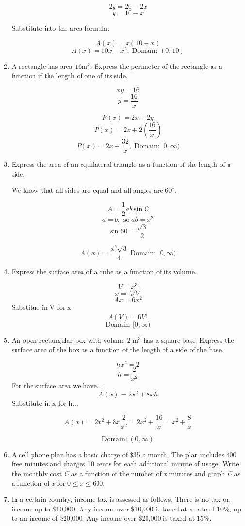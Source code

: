 \documentclass{article}
\begin{document}
\begin{enumerate}
		$$2y = 20 - 2x$$
		$$y = 10 - x$$
		
		Substitute into the area formula.
		
		$$A(x) = x(10 - x)$$
		$$A(x) = 10x - x^2, \text{ Domain: } (0, 10)$$
		
	\item A rectangle has area $16 \text{m}^2$. Express the perimeter of the rectangle as a
		function if the length of one of its side.
		
		$$xy = 16$$
		$$y = \frac{16}{x}$$
		
		$$P(x) = 2x + 2y$$
		$$P(x) = 2x + 2(\frac{16}{x})$$
		$$P(x) = 2x + \frac{32}{x}, \text{ Domain: } [0, \infty)$$
		
	\item Express the area of an equilateral triangle as a function of the length of a side.
	
		We know that all sides are equal and all angles are $60^{\circ}$.

		$$A = \frac{1}{2}ab\sin C$$
		$$ a = b, \text{ so } ab = x^2 $$
		$$\sin 60 = \frac{\sqrt{3}}{2}$$

		$$ A(x) = \frac{x^2\sqrt{3}}{4} \text{ Domain: } [0, \infty)$$

	\item Express the surface area of a cube as a function of its volume.

		$$V = x^3$$
		$$x = \sqrt[3]{V}$$
		$$A{x} = 6 x^2$$
		Substitue in V for x
		$$A(V) = 6 V^{\frac{2}{3}}$$
		$$\text{Domain: } [0, \infty)$$

	\item An open rectangular box with volume $2 \text{ m}^3$ has a square base.
		Express the surface area of the box as a function of the length of a side of the base.

		$$hx^2 = 2$$
		$$h = \frac{2}{x^2}$$
		For the surface area we have...
		$$A(x) = 2x^2 + 8xh$$
		Substitute in x for h...
	
		$$A(x) = 2x^2 + 8x\frac{2}{x^2} = 2x^2 + \frac{16}{x} = x^2 + \frac{8}{x}$$

	 	$$\text{Domain: } (0, \infty)$$


	\item A cell phone plan has a basic charge of \$35 a month. The plan includes 400 free minutes
		and charges 10 cents for each additional minute of usage. Write the monthly cost \emph{C}
		as a function of the number of \emph{x} minutes and graph \emph{C} as a function
		of \emph{x} for $0 \leq x \leq 600$.
		
	\item In a certain country, income tax is assessed as follows. There is no tax on income up to \$10,000.
		Any income over \$10,000 is taxed at a rate of 10\%, up to an income of \$20,000. Any income
		over \$20,000 is taxed at 15\%.
		

\end{enumerate}
\end{document}

